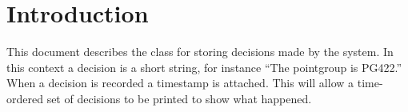 \documentclass[a4paper, 11pt]{article}
\begin{document}
\section{Introduction}

This document describes the class for storing decisions made by the system.
In this context a decision is a short string, for instance ``The pointgroup
is PG422.'' When a decision is recorded a timestamp is attached. This will 
allow a time-ordered set of decisions to be printed to show what happened.
\end{document}
